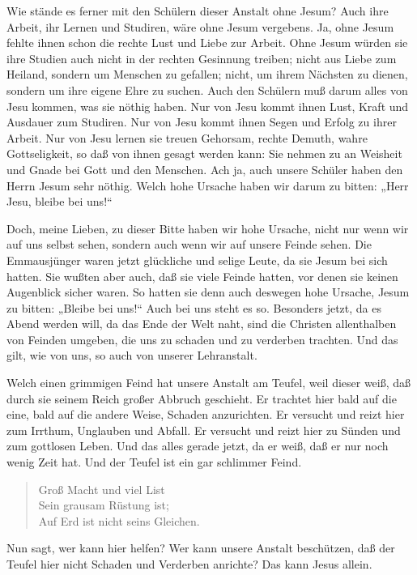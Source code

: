 Wie stände es ferner mit den Schülern dieser Anstalt ohne Jesum? Auch ihre Arbeit, ihr Lernen und Studiren, wäre ohne Jesum vergebens. Ja, ohne Jesum fehlte ihnen schon die rechte Lust und Liebe zur Arbeit. Ohne Jesum würden sie ihre Studien auch nicht in der rechten Gesinnung treiben; nicht aus Liebe zum Heiland, sondern um Menschen zu gefallen; nicht, um ihrem Nächsten zu dienen, sondern um ihre eigene Ehre zu suchen. Auch den Schülern muß darum alles von Jesu kommen, was sie nöthig haben. Nur von Jesu kommt ihnen Lust, Kraft und Ausdauer zum Studiren. Nur von Jesu kommt ihnen Segen und Erfolg zu ihrer Arbeit. Nur von Jesu lernen sie treuen Gehorsam, rechte Demuth, wahre Gottseligkeit, so daß von ihnen gesagt werden kann: Sie nehmen zu an Weisheit und Gnade bei Gott und den Menschen. Ach ja, auch unsere Schüler haben den Herrn Jesum sehr nöthig. Welch hohe Ursache haben wir darum zu bitten: „Herr Jesu, bleibe bei uns!“

Doch, meine Lieben, zu dieser Bitte haben wir hohe Ursache, nicht nur wenn wir auf uns selbst sehen, sondern auch wenn wir auf unsere Feinde sehen. Die Emmausjünger waren jetzt glückliche und selige Leute, da sie Jesum bei sich hatten. Sie wußten aber auch, daß sie viele Feinde hatten, vor denen sie keinen Augenblick sicher waren. So hatten sie denn auch deswegen hohe Ursache, Jesum zu bitten: „Bleibe bei uns!“ Auch bei uns steht es so. Besonders jetzt, da es Abend werden will, da das Ende der Welt naht, sind die Christen allenthalben von Feinden umgeben, die uns zu schaden und zu verderben trachten. Und das gilt, wie von uns, so auch von unserer Lehranstalt.

Welch einen grimmigen Feind hat unsere Anstalt am Teufel, weil dieser weiß, daß durch sie seinem Reich großer Abbruch geschieht. Er trachtet hier bald auf die eine, bald auf die andere Weise, Schaden anzurichten. Er versucht und reizt hier zum Irrthum, Unglauben und Abfall. Er versucht und reizt hier zu Sünden und zum gottlosen Leben. Und das alles gerade jetzt, da er weiß, daß er nur noch wenig Zeit hat. Und der Teufel ist ein gar schlimmer Feind.

\begin{verse}
Groß Macht und viel List\\
Sein grausam Rüstung ist;\\
Auf Erd ist nicht seins Gleichen.
\end{verse}

Nun sagt, wer kann hier helfen? Wer kann unsere Anstalt beschützen, daß der Teufel hier nicht Schaden und Verderben anrichte? Das kann Jesus allein.

